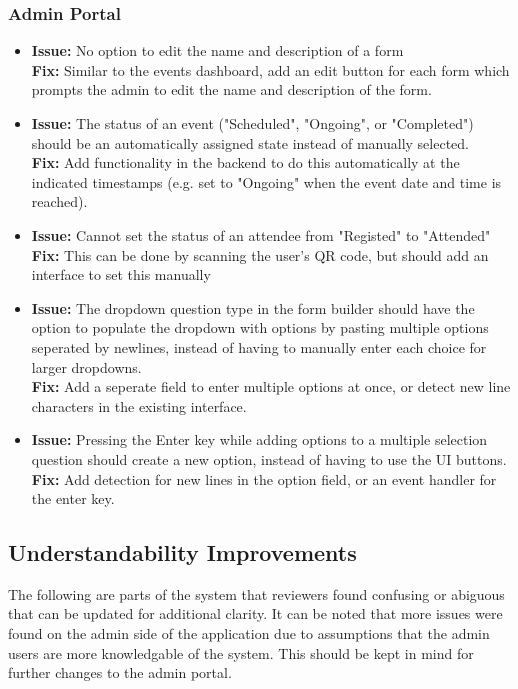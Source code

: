 \documentclass[12pt, titlepage]{article}
\begin{document}
\subsubsection{Admin Portal}
\begin{itemize}
    \item
    \textbf{Issue:} No option to edit the name and description of a form
    \\
    \textbf{Fix:} Similar to the events dashboard, add an edit button for each form which prompts the admin to edit the name and description of the form.
    \item
    \textbf{Issue:} The status of an event ("Scheduled", "Ongoing", or "Completed") should be an automatically assigned state instead of manually selected.
    \\
    \textbf{Fix:} Add functionality in the backend to do this automatically at the indicated timestamps (e.g. set to "Ongoing" when the event date and time is reached).
    \item
    \textbf{Issue:} Cannot set the status of an attendee from "Registed" to "Attended"
    \\
    \textbf{Fix:} This can be done by scanning the user's QR code, but should add an interface to set this manually
    \item
    \textbf{Issue:} The dropdown question type in the form builder should have the option to populate the dropdown with options by pasting multiple options seperated by newlines, instead of having to manually enter each choice for larger dropdowns.
    \\
    \textbf{Fix:} Add a seperate field to enter multiple options at once, or detect new line characters in the existing interface.
    \item
    \textbf{Issue:} Pressing the Enter key while adding options to a multiple selection question should create a new option, instead of having to use the UI buttons.
    \\
    \textbf{Fix:} Add detection for new lines in the option field, or an event handler for the enter key.
\end{itemize}

\subsection{Understandability Improvements}

The following are parts of the system that reviewers found confusing or abiguous that can be updated for additional clarity. It can be noted that more issues were found on the admin side of the application due to assumptions that the admin users are more knowledgable of the system. This should be kept in mind for further changes to the admin portal.
\end{document}
